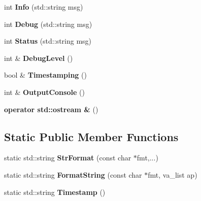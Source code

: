 \begin{DoxyCompactItemize}
\item 
\hypertarget{class_a_logger_a9b3186e34f76917f8eed4f789f160f8d}{}int {\bfseries Info} (std\+::string msg)\label{class_a_logger_a9b3186e34f76917f8eed4f789f160f8d}

\item 
\hypertarget{class_a_logger_a5f55d3c517fd61412af827229fdc1bf7}{}int {\bfseries Debug} (std\+::string msg)\label{class_a_logger_a5f55d3c517fd61412af827229fdc1bf7}

\item 
\hypertarget{class_a_logger_af08cbc4a4e317bfe9907baa3aceb8485}{}int {\bfseries Status} (std\+::string msg)\label{class_a_logger_af08cbc4a4e317bfe9907baa3aceb8485}

\item 
\hypertarget{class_a_logger_a1c9a40f9a8b0067adbb5fc795e3bd5b5}{}int \& {\bfseries Debug\+Level} ()\label{class_a_logger_a1c9a40f9a8b0067adbb5fc795e3bd5b5}

\item 
\hypertarget{class_a_logger_acabf9035c4ee58fbe49b251bfc245650}{}bool \& {\bfseries Timestamping} ()\label{class_a_logger_acabf9035c4ee58fbe49b251bfc245650}

\item 
\hypertarget{class_a_logger_aff003fac697a2418e34d9edee7cb2d3d}{}int \& {\bfseries Output\+Console} ()\label{class_a_logger_aff003fac697a2418e34d9edee7cb2d3d}

\item 
\hypertarget{class_a_logger_a48c1c2a99a7d0926316740f70e0efff7}{}{\bfseries operator std\+::ostream \&} ()\label{class_a_logger_a48c1c2a99a7d0926316740f70e0efff7}

\end{DoxyCompactItemize}
\subsection*{Static Public Member Functions}
\begin{DoxyCompactItemize}
\item 
\hypertarget{class_a_logger_a5f0ed1de31db92774d8f5f5cea732e3a}{}static std\+::string {\bfseries Str\+Format} (const char $\ast$fmt,...)\label{class_a_logger_a5f0ed1de31db92774d8f5f5cea732e3a}

\item 
\hypertarget{class_a_logger_a3efd1ed767373348bda6cbe68073f51b}{}static std\+::string {\bfseries Format\+String} (const char $\ast$fmt, va\+\_\+list ap)\label{class_a_logger_a3efd1ed767373348bda6cbe68073f51b}

\item 
\hypertarget{class_a_logger_a9d2a8dec435a8bb54a3929aaa33795cf}{}static std\+::string {\bfseries Timestamp} ()\label{class_a_logger_a9d2a8dec435a8bb54a3929aaa33795cf}

\end{DoxyCompactItemize}
